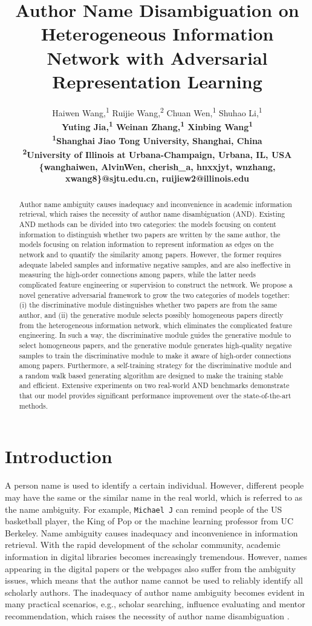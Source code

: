 \documentclass[letterpaper]{article}
\title{Author Name Disambiguation on Heterogeneous Information Network with Adversarial Representation Learning}
\author{
Haiwen Wang,\textsuperscript{\rm 1}
Ruijie Wang,\textsuperscript{\rm 2}
Chuan Wen,\textsuperscript{\rm 1}
Shuhao Li,\textsuperscript{\rm 1} \\
\bf \Large
Yuting Jia,\textsuperscript{\rm 1}
Weinan Zhang,\textsuperscript{\rm 1}
Xinbing Wang\textsuperscript{\rm 1}  \\
\textsuperscript{\rm 1}Shanghai Jiao Tong University, Shanghai, China\\
\textsuperscript{\rm 2}University of Illinois at Urbana-Champaign, Urbana, IL, USA\\
\{wanghaiwen, AlvinWen, cherish\_a, hnxxjyt, wnzhang, xwang8\}@sjtu.edu.cn,
ruijiew2@illinois.edu}
\begin{document}
\maketitle

\begin{abstract}

Author name ambiguity causes inadequacy and inconvenience in academic information retrieval, which raises the necessity of author name disambiguation (AND).
Existing AND methods can be divided into two categories: the models focusing on content information to distinguish whether two papers are written by the same author, the models focusing on relation information to represent information as edges on the network and to quantify the similarity among papers.
However, the former requires adequate labeled samples and informative negative samples, and are also ineffective in measuring the high-order connections among papers,
while the latter needs complicated feature engineering or supervision to construct the network.
We propose a novel generative adversarial framework to grow the two categories of models together:
(i) the discriminative module distinguishes whether two papers are from the same author, and (ii)
the generative module selects possibly homogeneous papers directly from the heterogeneous information network, which eliminates the complicated feature engineering.
In such a way, the discriminative module guides the generative module to select homogeneous papers, and the generative module generates high-quality negative samples to train the discriminative module to make it aware of high-order connections among papers.
Furthermore,
a self-training strategy for the discriminative module and a random walk based generating algorithm are designed to make the training stable and efficient.
Extensive experiments on two real-world AND benchmarks demonstrate that our model provides significant performance improvement over the state-of-the-art  methods.

\end{abstract}

\section{Introduction}

A person name is used to identify a certain individual.
However, different people may have the same or the similar name in the real world, which is referred to as the name ambiguity.
For example, \texttt{Michael J} can remind people of the US basketball player, the King of Pop or the machine learning professor from UC Berkeley.
Name ambiguity causes inadequacy and inconvenience in information retrieval.
With the rapid development of the scholar community, academic information in digital libraries becomes increasingly tremendous.
However, names appearing in the digital papers or the webpages also suffer from the ambiguity issues, which means that the author name cannot be used to reliably identify all scholarly authors.
The inadequacy of author name ambiguity becomes evident in many practical scenarios, e.g., scholar searching, influence evaluating and mentor recommendation, which raises the necessity of author name disambiguation \cite{smalheiser2009author}.
\end{document}
